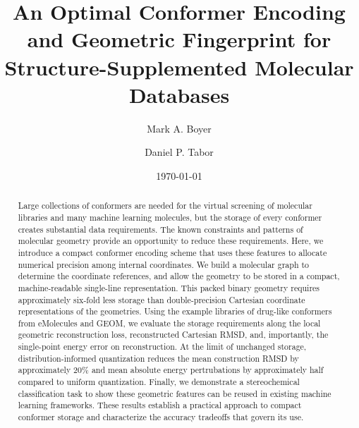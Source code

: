 \documentclass[%
 preprint,
superscriptaddress,
 amsmath,amssymb,
 aip,
 jcp,
]{revtex4-2}
\begin{document}
\title{
An Optimal Conformer Encoding and Geometric Fingerprint for Structure-Supplemented Molecular Databases
}
\date{\today}

\author{Mark A. Boyer}

\author{Daniel P. Tabor}

\begin{abstract}
Large collections of conformers are needed for the virtual screening of molecular libraries and many machine learning molecules, but the storage of every conformer creates substantial data requirements. The known constraints and patterns of molecular geometry provide an opportunity to reduce these requirements. 
%
Here, we introduce a compact conformer encoding scheme that uses these features to allocate numerical precision among internal coordinates. We build a molecular graph to determine the coordinate references, and allow the geometry to be stored in a compact, machine-readable single-line representation. This packed binary geometry requires approximately six-fold less storage than double-precision Cartesian coordinate representations of the geometries. 
Using the example libraries of drug-like conformers from eMolecules and GEOM, we evaluate the storage requirements along the local geometric reconstruction loss, reconstructed Cartesian RMSD, and, importantly, the single-point energy error on reconstruction. 
At the limit of unchanged storage, distribution-informed quantization reduces the mean construction RMSD by approximately 20\% and mean absolute energy pertrubations by approximately half compared to uniform quantization. Finally, we demonstrate a stereochemical classification task to show these geometric features can be reused in existing machine learning frameworks. These results establish a practical approach to compact conformer storage and characterize the accuracy tradeoffs that govern its use. 
\end{abstract}


\maketitle
\end{document}
